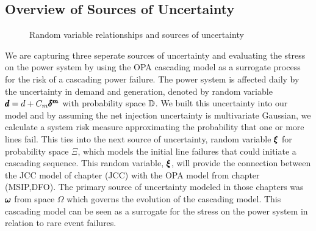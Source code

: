 \subsection{Overview of Sources of Uncertainty}

\begin{figure}
\centering
{} 
\caption{Random variable relationships and sources of uncertainty}
\end{figure}

We are capturing three seperate sources of uncertainty and evaluating the stress on the power system by using the OPA cascading model as a surrogate process for the risk of a cascading power failure.  The power system is affected daily by the uncertainty in demand and generation, denoted by random variable $\pmb{d} = d + C_m \pmb{\delta^m}$ with  probability space $\mathbb{D}$.  We built this uncertainty into our model and by assuming the net injection uncertainty is multivariate Gaussian, we calculate a system risk measure approximating the probability that one or more lines fail.  This ties into the next source of uncertainty, random variable $\pmb{\xi}$ for probability space $\Xi$, which models the initial line failures that could initiate a cascading sequence.  This random variable, $\pmb{\xi}$, will provide the connection between the JCC model of chapter (JCC) with the OPA model from chapter (MSIP,DFO).  The primary source of uncertainty modeled in those chapters was $\pmb{\omega}$ from space $\Omega$ which governs the evolution of the cascading model.  This cascading model can be seen as a surrogate for the stress on the power system in relation to rare event failures.     

